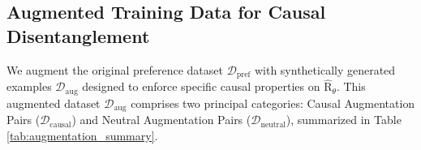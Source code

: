 
\vspace{-0.1in}
\subsection{Augmented Training Data for Causal Disentanglement}
\label{subsec:data_augmentation}

\vspace{-0.1in}
We augment the original preference dataset $\mathcal{D}_{\mathrm{pref}}$ with synthetically generated examples $\mathcal{D}_{\mathrm{aug}}$ designed to enforce specific causal properties on $\hat{\mathrm{R}}_\theta$. This augmented dataset $\mathcal{D}_{\mathrm{aug}}$ comprises two principal categories: Causal Augmentation Pairs ($\mathcal{D}_{\mathrm{causal}}$) and Neutral Augmentation Pairs ($\mathcal{D}_{\mathrm{neutral}}$), summarized in Table \ref{tab:augmentation_summary}.



